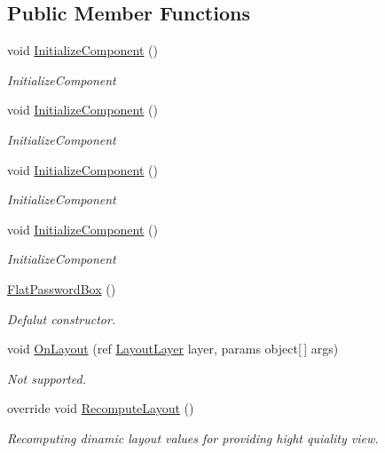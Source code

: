 \subsection*{Public Member Functions}
\begin{DoxyCompactItemize}
\item 
void \mbox{\hyperlink{class_wpf_handler_1_1_u_i_1_1_controls_1_1_flat_password_box_a123fe4c018543ad3c8ed399e9f94b617}{Initialize\+Component}} ()
\begin{DoxyCompactList}\small\item\em Initialize\+Component \end{DoxyCompactList}\item 
void \mbox{\hyperlink{class_wpf_handler_1_1_u_i_1_1_controls_1_1_flat_password_box_a123fe4c018543ad3c8ed399e9f94b617}{Initialize\+Component}} ()
\begin{DoxyCompactList}\small\item\em Initialize\+Component \end{DoxyCompactList}\item 
void \mbox{\hyperlink{class_wpf_handler_1_1_u_i_1_1_controls_1_1_flat_password_box_a123fe4c018543ad3c8ed399e9f94b617}{Initialize\+Component}} ()
\begin{DoxyCompactList}\small\item\em Initialize\+Component \end{DoxyCompactList}\item 
void \mbox{\hyperlink{class_wpf_handler_1_1_u_i_1_1_controls_1_1_flat_password_box_a123fe4c018543ad3c8ed399e9f94b617}{Initialize\+Component}} ()
\begin{DoxyCompactList}\small\item\em Initialize\+Component \end{DoxyCompactList}\item 
\mbox{\hyperlink{class_wpf_handler_1_1_u_i_1_1_controls_1_1_flat_password_box_a9f197f0001f085f6d6e0a0f332793499}{Flat\+Password\+Box}} ()
\begin{DoxyCompactList}\small\item\em Defalut constructor. \end{DoxyCompactList}\item 
void \mbox{\hyperlink{class_wpf_handler_1_1_u_i_1_1_controls_1_1_flat_password_box_a8a06600a127d2b9bc7a1a04767f383e8}{On\+Layout}} (ref \mbox{\hyperlink{class_wpf_handler_1_1_u_i_1_1_auto_layout_1_1_layout_layer}{Layout\+Layer}} layer, params object\mbox{[}$\,$\mbox{]} args)
\begin{DoxyCompactList}\small\item\em Not supported. \end{DoxyCompactList}\item 
override void \mbox{\hyperlink{class_wpf_handler_1_1_u_i_1_1_controls_1_1_flat_password_box_abe285f06393d65f13af4b293f9eb0941}{Recompute\+Layout}} ()
\begin{DoxyCompactList}\small\item\em Recomputing dinamic layout values for providing hight quiality view. \end{DoxyCompactList}\end{DoxyCompactItemize}

